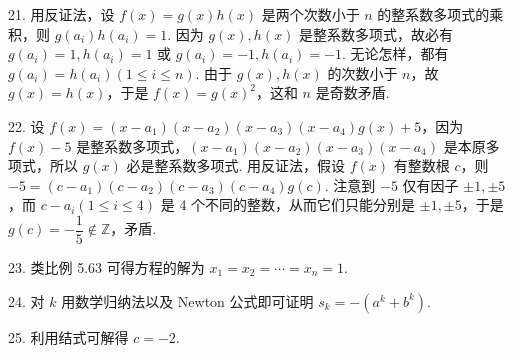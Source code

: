 \documentclass[UTF8,12pt,a4paper,fontset=fandol]{ctexart}
\begin{document}
21. 用反证法，设 $f(x)=g(x)h(x)$ 是两个次数小于 $n$ 的整系数多项式的乘积，则 $g(a_i)h(a_i)=1$. 因为 $g(x),h(x)$ 是整系数多项式，故必有 $g(a_i)=1,h(a_i)=1$ 或 $g(a_i)=-1,h(a_i)=-1$. 无论怎样，都有 $g(a_i)=h(a_i)(1\le i\le n)$. 由于 $g(x),h(x)$ 的次数小于 $n$，故 $g(x)=h(x)$，于是 $f(x)=g(x)^2$，这和 $n$ 是奇数矛盾.

22. 设 $f(x)=(x-a_1)(x-a_2)(x-a_3)(x-a_4)g(x)+5$，因为 $f(x)-5$ 是整系数多项式，$(x-a_1)(x-a_2)(x-a_3)(x-a_4)$ 是本原多项式，所以 $g(x)$ 必是整系数多项式. 用反证法，假设 $f(x)$ 有整数根 $c$，则 $-5=(c-a_1)(c-a_2)(c-a_3)(c-a_4)g(c)$. 注意到 $-5$ 仅有因子 $\pm1,\pm5$，而 $c-a_i(1\le i\le4)$ 是 4 个不同的整数，从而它们只能分别是 $\pm1,\pm5$，于是 $g(c)=-\dfrac{1}{5}\notin\mathbb{Z}$，矛盾.

23. 类比例 5.63 可得方程的解为 $x_1=x_2=\cdots=x_n=1$.

24. 对 $k$ 用数学归纳法以及 Newton 公式即可证明 $s_k=-(a^k+b^k)$.

25. 利用结式可解得 $c=-2$.
\end{document}
